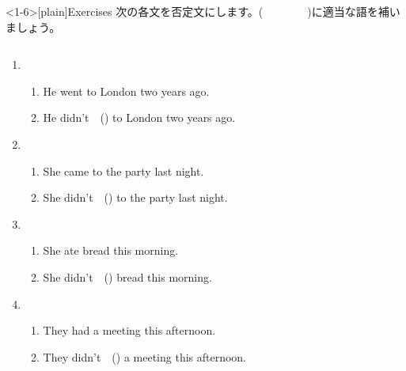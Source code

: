 \documentclass[aspectratio=169,xcolor={dvipsnames,table}]{beamer}
\begin{document}
\begin{frame}<1-6>[plain]{Exercises}
 次の各文を否定文にします。(~~~~~~~~)に適当な語を補いましょう。

\begin{columns}
\begin{column}{.6\textwidth}
\begin{enumerate}
 \item \begin{enumerate}
	\item He went to London two years ago.
	\item He didn't~~() to London two years ago.
       \end{enumerate}
 \item \begin{enumerate}
	\item She came to the party last night.
	\item She didn't~~() to the party last night.
       \end{enumerate}
 \item \begin{enumerate}
	\item She ate bread this morning.
	\item She didn't~~() bread this morning.
       \end{enumerate}
 \item \begin{enumerate}
	\item They had a meeting this afternoon.
	\item They didn't~~() a meeting this afternoon.
       \end{enumerate}
\end{enumerate}
\end{column}
\begin{column}{.35\textwidth}
%
\end{column}
\end{columns}
\end{frame}
\end{document}
